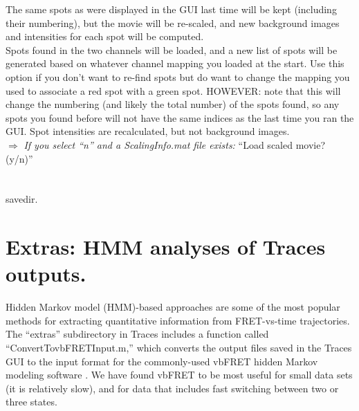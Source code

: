 \documentclass[11pt]{article}
\begin{document}
\indent\indent{} The same spots as were displayed in the GUI last
\indent\indent\indent\indent  time will be kept (including their numbering), but the movie will be re-scaled, and new
\indent\indent\indent\indent background images and intensities for each spot will be computed.\\

\indent\indent{} Spots found in the two channels will be loaded, and a new list of spots 
\indent\indent\indent\indent will be generated based on whatever channel mapping you loaded at the start.  Use  
\indent\indent\indent\indent this option if you don't want to re-find spots but do want to change the mapping you  
\indent\indent\indent\indent used to associate a red spot with a green spot.  HOWEVER: note that this will change 
\indent\indent\indent\indent the numbering (and likely the total number) of the spots found, so any spots you found 
\indent\indent\indent\indent before will not have the same indices as the last time you ran the GUI.  Spot intensities 
\indent\indent\indent\indent are recalculated, but not background images.\\

\indent\indent $\Rightarrow$ {\it If you select ``n'' and a ScalingInfo.mat file exists:} ``Load scaled movie? (y/n)''\\

\indent\indent\indent{}\\

\indent\indent\indent{}\\

 savedir.

\newpage

\section{Extras: HMM analyses of Traces outputs.}

Hidden Markov model (HMM)-based approaches are some of the most popular methods for extracting quantitative information from FRET-vs-time trajectories. The ``extras'' subdirectory in Traces includes a function called ``ConvertTovbFRETInput.m,'' which converts the output files saved in the Traces GUI to the input format for the commonly-used vbFRET hidden Markov modeling software \cite{Bronson2009}. We have found vbFRET to be most useful for small data sets (it is relatively slow), and for data that includes fast switching between two or three states.
\end{document}
